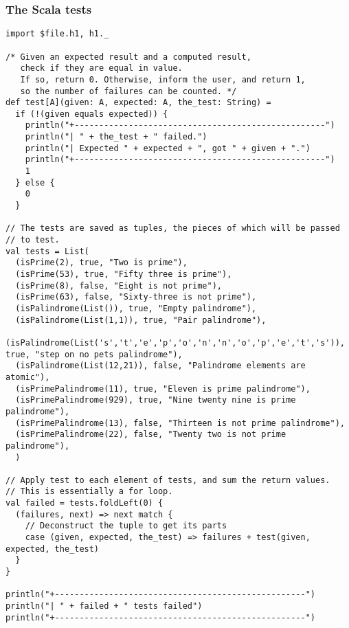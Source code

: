 \documentclass[11pt]{article}
\begin{document}
\subsubsection*{The Scala tests}
\label{sec:org7d8fa00}
\begin{verbatim}
import $file.h1, h1._

/* Given an expected result and a computed result,
   check if they are equal in value.
   If so, return 0. Otherwise, inform the user, and return 1,
   so the number of failures can be counted. */
def test[A](given: A, expected: A, the_test: String) =
  if (!(given equals expected)) {
    println("+---------------------------------------------------")
    println("| " + the_test + " failed.")
    println("| Expected " + expected + ", got " + given + ".")
    println("+---------------------------------------------------")
    1
  } else {
    0
  }

// The tests are saved as tuples, the pieces of which will be passed
// to test.
val tests = List(
  (isPrime(2), true, "Two is prime"),
  (isPrime(53), true, "Fifty three is prime"),
  (isPrime(8), false, "Eight is not prime"),
  (isPrime(63), false, "Sixty-three is not prime"),
  (isPalindrome(List()), true, "Empty palindrome"),
  (isPalindrome(List(1,1)), true, "Pair palindrome"),
  (isPalindrome(List('s','t','e','p','o','n','n','o','p','e','t','s')), true, "step on no pets palindrome"),
  (isPalindrome(List(12,21)), false, "Palindrome elements are atomic"),
  (isPrimePalindrome(11), true, "Eleven is prime palindrome"),
  (isPrimePalindrome(929), true, "Nine twenty nine is prime palindrome"),
  (isPrimePalindrome(13), false, "Thirteen is not prime palindrome"),
  (isPrimePalindrome(22), false, "Twenty two is not prime palindrome"),
  )

// Apply test to each element of tests, and sum the return values.
// This is essentially a for loop.
val failed = tests.foldLeft(0) {
  (failures, next) => next match {
    // Deconstruct the tuple to get its parts
    case (given, expected, the_test) => failures + test(given, expected, the_test)
  }
}

println("+---------------------------------------------------")
println("| " + failed + " tests failed")
println("+---------------------------------------------------")
\end{verbatim}
\end{document}

